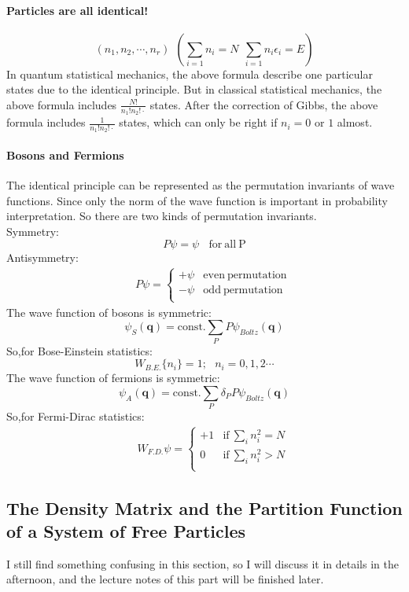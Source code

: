 \documentclass{article}
\begin{document}
\paragraph{Particles are all identical!}
\[(n_1,n_2,\cdots,n_r)  \ \  (\sum_{i=1}n_i =N \ \ \sum_{i=1}n_i\epsilon_i =E )\] 
In quantum statistical mechanics, the above formula describe one particular states due to the identical principle. But in classical statistical mechanics, the above formula includes $\frac{N!}{n_1!n_2!\cdot}$
states. After the correction of Gibbs,  the above formula includes  $\frac{1}{n_1!n_2!\cdot}$ states, which can only be right if $n_i=0$ or $1$ almost. 

\paragraph{Bosons and Fermions}
The identical principle can be represented as the permutation invariants  of wave functions. Since only the norm of the wave function is important in probability interpretation. So there are two kinds of  permutation invariants. \\
Symmetry:
\begin{equation}
P \psi = \psi \ \ \ \ \mathrm{for\  all \ P}
\end{equation}
Antisymmetry:
\begin{eqnarray}&&
 P \psi =\left\{\begin{array}{cc}
 +\psi       & \mathrm{even \ permutation}       \\
 -\psi       & \mathrm{odd \ permutation}      \\
 \end{array} \right.
\end {eqnarray}
The wave function of bosons is symmetric:
\begin{equation}
\psi_S(\mathbf{q})= \mathrm{const.} \sum_P P \psi_{Boltz}(\mathbf{q})
\end{equation}
So,for Bose-Einstein statistics:
\begin{equation}
 W_{B.E.} \{n_i\} =1 ; \ \ \ n_i=0,1,2\cdots
 \end{equation} 
 The wave function of fermions is symmetric:
\begin{equation}
\psi_A(\mathbf{q})= \mathrm{const.} \sum_P \delta_P P \psi_{Boltz}(\mathbf{q})
\end{equation}
So,for Fermi-Dirac statistics:
 \begin{eqnarray}&&
 W_{F.D.} \psi =\left\{\begin{array}{cc}
 +1   & \mathrm{if} \ \sum_i n_i^2=N    \\
 0    & \mathrm{if} \ \sum_i n_i^2>N    \\
 \end{array} \right.
 \end {eqnarray}
 
 \subsection{The Density Matrix and the Partition Function of a System of Free Particles}
 I still find something confusing in this section, so I will discuss it in details in the afternoon, and the lecture notes of this part will be finished later.
\end{document}
